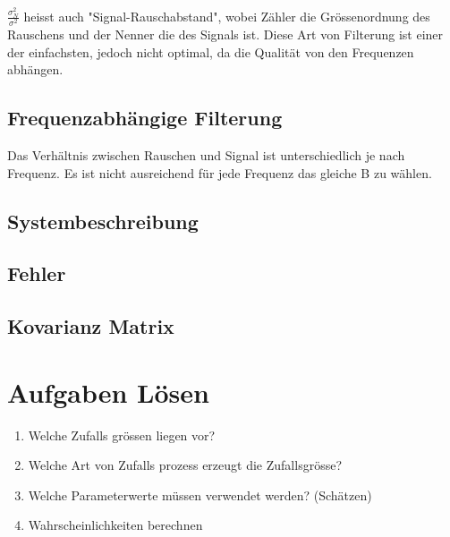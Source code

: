 \documentclass[../Main.tex]{subfiles}
\begin{document}
\(\frac{\sigma_N^2}{\sigma^2}\) heisst auch "Signal-Rauschabstand", wobei Zähler
die Grössenordnung des Rauschens und der Nenner die des Signals ist.
Diese Art von Filterung ist einer der einfachsten, jedoch nicht optimal, da
die Qualität von den Frequenzen abhängen.

\subsection{Frequenzabhängige Filterung}
Das Verhältnis zwischen Rauschen und Signal ist unterschiedlich je nach Frequenz.
Es ist nicht ausreichend für jede Frequenz das gleiche B zu wählen.

\subsection{Systembeschreibung}
\subsection{Fehler}
\subsection{Kovarianz Matrix}

\section{Aufgaben Lösen}
\begin{enumerate}
    \item Welche Zufalls grössen liegen vor?
    \item Welche Art von Zufalls prozess erzeugt die Zufallsgrösse?
    \item Welche Parameterwerte müssen verwendet werden? (Schätzen)
    \item Wahrscheinlichkeiten berechnen
\end{enumerate}
\end{document}
